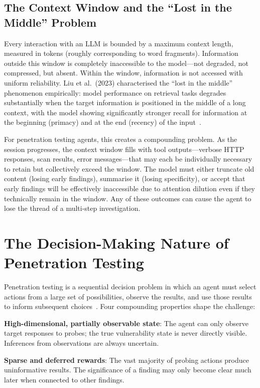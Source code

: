 \documentclass[12pt,a4paper,oneside,openany]{book}
\begin{document}
\subsection{The Context Window and the ``Lost in the Middle'' Problem}

Every interaction with an LLM is bounded by a maximum context length, measured in tokens (roughly corresponding to word fragments). Information outside this window is completely inaccessible to the model---not degraded, not compressed, but absent. Within the window, information is not accessed with uniform reliability. Liu et al.\ (2023) characterised the ``lost in the middle'' phenomenon empirically: model performance on retrieval tasks degrades substantially when the target information is positioned in the middle of a long context, with the model showing significantly stronger recall for information at the beginning (primacy) and at the end (recency) of the input~\cite{liu2023lost}. 

For penetration testing agents, this creates a compounding problem. As the session progresses, the context window fills with tool outputs---verbose HTTP responses, scan results, error messages---that may each be individually necessary to retain but collectively exceed the window. The model must either truncate old content (losing early findings), summarise it (losing specificity), or accept that early findings will be effectively inaccessible due to attention dilution even if they technically remain in the window. Any of these outcomes can cause the agent to lose the thread of a multi-step investigation.

\section{The Decision-Making Nature of Penetration Testing}

Penetration testing is a sequential decision problem in which an agent must select actions from a large set of possibilities, observe the results, and use those results to inform subsequent choices~\citep{russell2020ai}. Four compounding properties shape the challenge:

\textbf{High-dimensional, partially observable state}: The agent can only observe target responses to probes; the true vulnerability state is never directly visible. Inferences from observations are always uncertain.

\textbf{Sparse and deferred rewards}: The vast majority of probing actions produce uninformative results. The significance of a finding may only become clear much later when connected to other findings.
\end{document}
